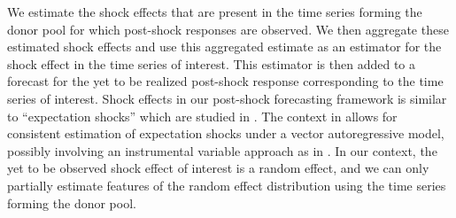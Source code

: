 \documentclass[11pt]{article}
\theoremstyle{definition}
\begin{document}
We estimate the shock effects that are present in the time series forming the donor pool for which post-shock responses are observed. We then aggregate these estimated shock effects and use this aggregated estimate as an estimator for the shock effect in the time series of interest. This estimator is then added to a forecast for the yet to be realized post-shock response corresponding to the time series of interest. Shock effects in our post-shock forecasting framework is similar to ``expectation shocks'' which are studied in \cite{clements2019measuring}. The context in \cite{clements2019measuring} allows for consistent estimation of expectation shocks under a vector autoregressive model, possibly involving an instrumental variable approach as in \cite{croushore2006data}. In our context, the yet to be observed shock effect of interest is a random effect, and we can only partially estimate features of the random effect distribution using the time series forming the donor pool. 






\end{document}
